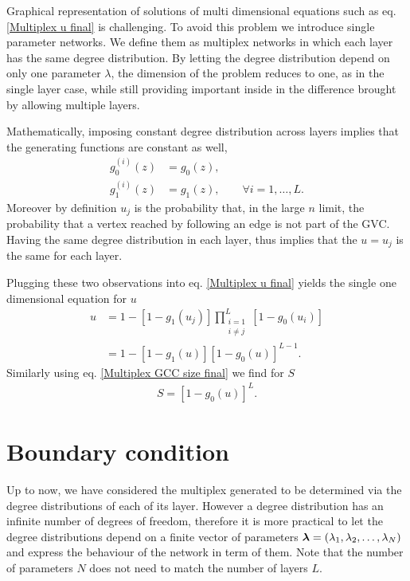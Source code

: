 \documentclass[
11pt, %
english, %
singlespacing, %
nolistspacing, %
liststotoc, %
headsepline, %
]{MastersDoctoralThesis} %
\begin{document}
Graphical representation of solutions of multi dimensional equations such as eq. \eqref{Multiplex u final} is challenging. To avoid this problem we introduce single parameter networks. We define them as multiplex networks in which each layer has the same degree distribution. By letting the degree distribution depend on only one parameter $\lambda$, the dimension of the problem reduces to one, as in the single layer case, while still providing important inside in the difference brought by allowing multiple layers.

Mathematically, imposing constant degree distribution across layers implies that the generating functions are constant as well,
\begin{align}
	g^{(i)}_0(z) &= g_0(z), \\
	g^{(i)}_1(z) &= g_1(z), \qquad \forall i = 1, \dots, L.
\end{align}
Moreover by definition $u_j$ is the probability that, in the large $n$ limit, the probability that a vertex reached by following an edge is not part of the GVC. Having the same degree distribution in each layer, thus implies that the $u = u_j$ is the same for each layer.

Plugging these two observations into eq. \eqref{Multiplex u final} yields the single one dimensional equation for $u$
\begin{align}
	u &= 1 - \left[1 - g_1(u_j) \right] \prod_{\substack{i = 1 \\ i \neq j}}^{L}  \left[1 - g_0(u_i) \right] \\
		&= 1 - \left[1 - g_1(u) \right] \left[1 - g_0(u) \right]^{L - 1}. \label{Single parameter u final}
\end{align}
Similarly using eq. \eqref{Multiplex GCC size final} we find for $S$
\begin{align}
	S = \left[1 - g_0(u) \right]^L.
\end{align}

\section{Boundary condition}
\label{Section: Boundary condition for multilayer}


Up to now, we have considered the multiplex generated to be determined via the degree distributions of each of its layer. However a degree distribution has an infinite number of degrees of freedom, therefore it is more practical to let the degree distributions depend on a finite vector of parameters $\boldsymbol{\mathrm{\lambda}} = (\lambda_1, \lambda_2, \dots, \lambda_N)$ and express the behaviour of the network in term of them. Note that the number of parameters $N$ does not need to match the number of layers $L$.
\end{document}
